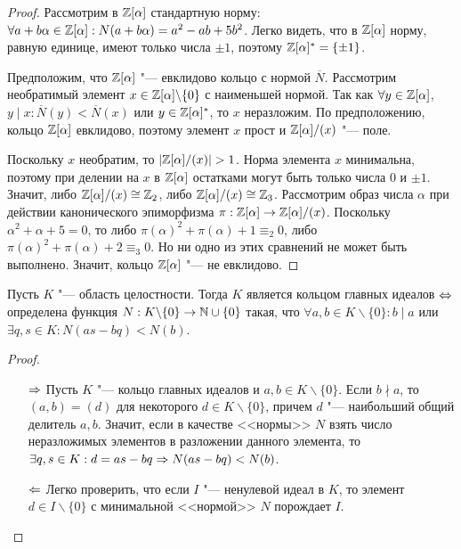 \begin{proof}
	Рассмотрим в $\mathbb{Z}[\alpha]$ стандартную норму: $\forall a + b\alpha \hm\in \Z[\alpha]: N(a + b\alpha) \hm= a^2 - ab + 5b^2$. Легко видеть, что в $\mathbb{Z}[\alpha]$ норму, равную единице, имеют только числа $\pm1$, поэтому $\mathbb{Z}[\alpha]^* = \{\pm1\}$.
		
	Предположим, что $\mathbb{Z}[\alpha]$ "--- евклидово кольцо с нормой $\overline{N}$. Рассмотрим необратимый элемент $x \in \mathbb{Z}[\alpha] \backslash \{0\}$ с наименьшей нормой. Так как $\forall y \in \mathbb{Z}[\alpha]$, $y \mid x: \overline{N}(y) < \overline{N}(x)$ или $y \in \mathbb{Z}[\alpha]^*$, то $x$ неразложим. По предположению, кольцо $\mathbb{Z}[\alpha]$ евклидово, поэтому элемент $x$ прост и $\mathbb{Z}[\alpha] / (x)$ "--- поле.
	
	Поскольку $x$ необратим, то $|\mathbb{Z}[\alpha] / (x)| > 1$. Норма элемента $x$ минимальна, поэтому при делении на $x$ в $\mathbb{Z}[\alpha]$ остатками могут быть только числа $0$ и $\pm1$. Значит, либо $\mathbb{Z}[\alpha] / (x) \cong \mathbb{Z}_2$, либо $\mathbb{Z}[\alpha] / (x) \cong \mathbb{Z}_3$. Рассмотрим образ числа $\alpha$ при действии канонического эпиморфизма $\pi: \mathbb{Z}[\alpha] \to \mathbb{Z}[\alpha] / (x)$. Поскольку $\alpha^2 + \alpha + 5 = 0$, то либо $\pi(\alpha)^2 + \pi(\alpha) + 1 \equiv_2 0$, либо $\pi(\alpha)^2 + \pi(\alpha) + 2 \equiv_3 0$. Но ни одно из этих сравнений не может быть выполнено. Значит, кольцо $\mathbb{Z}[\alpha]$ "--- не евклидово.
\end{proof}

\begin{proposition}
	Пусть $K$ "--- область целостности. Тогда $K$ является кольцом главных идеалов $\Leftrightarrow$ определена функция $N: K\backslash\{0\} \to \mathbb{N} \cup \{0\}$ такая, что $\forall a, b \in K\backslash\{0\}: b \mid a$ или $\exists q, s \in K: N(as - bq) < N(b)$.
\end{proposition}

\begin{proof}~
	\begin{itemize}
		\item[$\Rightarrow$] Пусть $K$ "--- кольцо главных идеалов и $a, b \in K\backslash\{0\}$. Если $b \nmid a$, то $(a, b) = (d)$ для некоторого $d \in K\backslash\{0\}$, причем $d$ "--- наибольший общий делитель $a, b$. Значит, если в качестве <<нормы>> $N$ взять число неразложимых элементов в разложении данного элемента, то $\exists q, s \in K: d = as - bq \Rightarrow N(as - bq) < N(b)$.
		\item[$\Leftarrow$] Легко проверить, что если $I$ "--- ненулевой идеал в $K$, то элемент $d \in I \backslash \{0\}$ с минимальной <<нормой>> $N$ порождает $I$.\qedhere
	\end{itemize}
\end{proof}

